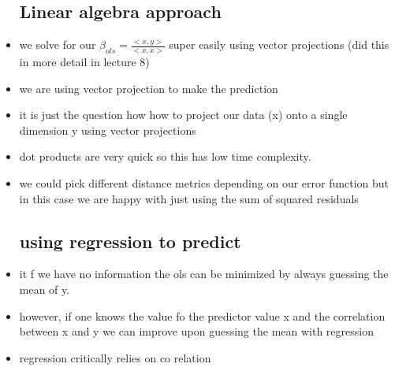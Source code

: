 \documentclass{article}
\begin{document}
\begin{itemize}
\subsection{Linear algebra approach}
\item we solve for our $\beta_{ols}=\frac{<x,y>}{<x,x>}$ super easily using vector projections (did this in more detail in lecture 8)
\item we are using vector projection to make the prediction 
\item it is just the question how how to project our data (x) onto a single dimension y using vector projections 
\item dot products are very quick so this has low time complexity.
\item we could pick different distance metrics depending on our error function but in this case we are happy with just using the sum of squared residuals
\subsection{using regression to predict}
\item it f we have no information the ols can be minimized by always guessing the mean of y.  
\item however, if one knows the value fo the predictor value x and the correlation between x and y we can improve upon guessing the mean with regression 
\item regression critically relies on co relation 

\end{itemize}
\end{document}
